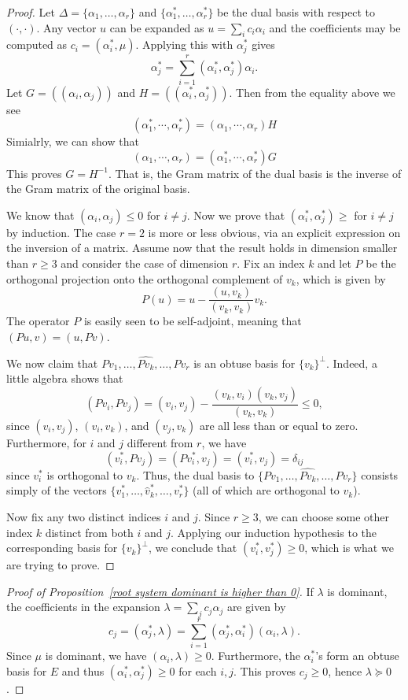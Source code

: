 \begin{proof}
Let $\Delta=\{\alpha_1,\dots,\alpha_r\}$ and $\{\alpha_1^*,\dots,\alpha_r^*\}$ be the dual basis with respect to $(\cdot,\cdot)$. Any vector $u$ can be expanded as $u=\sum_ic_i\alpha_i$ and the coefficients may be computed as $c_i=(\alpha_i^*,\mu)$. Applying this with $\alpha_j^*$ gives
\[\alpha_j^*=\sum_{i=1}^{r}(\alpha_i^*,\alpha_j^*)\alpha_i.\]
Let $G=((\alpha_i,\alpha_j))$ and $H=((\alpha_i^*,\alpha_j^*))$. Then from the equality above we see
\[(\alpha_1^*,\cdots,\alpha_r^*)=(\alpha_1,\cdots,\alpha_r)H\]
Simialrly, we can show that
\[(\alpha_1,\cdots,\alpha_r)=(\alpha_1^*,\cdots,\alpha_r^*)G\]
This proves $G=H^{-1}$. That is, the Gram matrix of the dual basis is the inverse of the Gram matrix of the original basis.\par
We know that $(\alpha_i,\alpha_j)\leq 0$ for $i\neq j$. Now we prove that $(\alpha_i^*,\alpha_j^*)\geq$ for $i\neq j$ by induction. The case $r=2$ is more or less obvious, via an explicit expression on the inversion of a matrix. Assume now that the result holds in dimension smaller than $r\geq 3$ and consider the case of dimension $r$. Fix an index $k$ and let $P$ be the orthogonal projection onto the orthogonal complement of $v_k$, which is given by
\[P(u)=u-\frac{(u,v_k)}{(v_k,v_k)}v_k.\]
The operator $P$ is easily seen to be self-adjoint, meaning that $(Pu,v)=(u,Pv)$.\par
We now claim that $Pv_1,\dots,\widehat{Pv_k},\dots,Pv_{r}$ is an obtuse basis for $\{v_k\}^\bot$. Indeed, a little algebra shows that
\[(Pv_i,Pv_j)=(v_i,v_j)-\frac{(v_k,v_i)(v_k,v_j)}{(v_k,v_k)}\leq 0,\]
since $(v_i,v_j)$, $(v_i,v_k)$, and $(v_j,v_k)$ are all less than or equal to zero. Furthermore, for $i$ and $j$ different from $r$, we have 
\[(v_i^*,Pv_j)=(Pv_i^*,v_j)=(v_i^*,v_j)=\delta_{ij}\]
since $v_i^*$ is orthogonal to $v_k$. Thus, the dual basis to $\{Pv_1,\dots,\widehat{Pv_k},\dots,Pv_{r}\}$ consists simply of the vectors $\{v_1^*,\dots,\widehat{v}_k^*,\dots,v_{r}^*\}$ (all of which are orthogonal to $v_k$).\par
Now fix any two distinct indices $i$ and $j$. Since $r\geq 3$, we can choose some other index $k$ distinct from both $i$ and $j$. Applying our induction hypothesis to the corresponding basis for $\{v_k\}^\bot$, we conclude that $(v_i^*,v_j^*)\geq 0$, which is what we are trying to prove.
\end{proof}
\begin{proof}[Proof of Proposition~\ref{root system dominant is higher than 0}]
If $\lambda$ is dominant, the coefficients in the expansion $\lambda=\sum_jc_j\alpha_j$ are given by
\[c_j=(\alpha_j^*,\lambda)=\sum_{i=1}^{r}(\alpha_j^*,\alpha_i^*)(\alpha_i,\lambda).\]
Since $\mu$ is dominant, we have $(\alpha_i,\lambda)\geq 0$. Furthermore, the $\alpha_i^*$'s form an obtuse basis for $E$ and thus $(\alpha_i^*,\alpha_j^*)\geq 0$ for each $i,j$. This proves $c_j\geq 0$, hence $\lambda\succeq 0$.
\end{proof}
